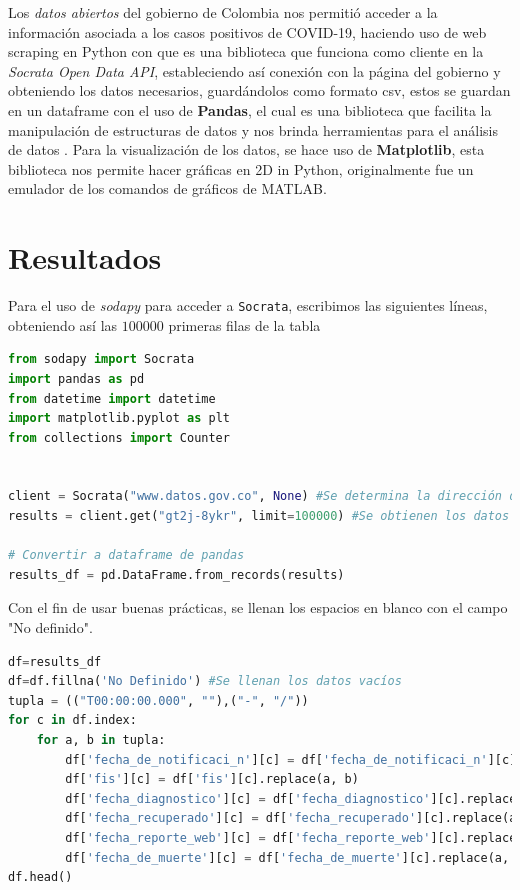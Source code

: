 \documentclass[conference,compsoc,onecolumn]{IEEEtran}
\begin{document}
Los \textit{datos abiertos} del gobierno de Colombia nos permitió acceder a la información asociada a los casos positivos de COVID-19, haciendo uso de web scraping en Python con  que es una biblioteca que funciona como cliente en la \textit{Socrata Open Data API}, estableciendo así conexión con la página del gobierno y obteniendo los datos necesarios, guardándolos como formato csv, estos se guardan en un dataframe con el uso de \textbf{Pandas}, el cual es una biblioteca que facilita la manipulación de estructuras de datos y nos brinda herramientas para el análisis de datos \cite{Pandas}. Para la visualización de los datos, se hace uso de \textbf{Matplotlib}, esta biblioteca nos permite hacer gráficas en 2D in Python, originalmente fue un emulador de los comandos de gráficos de MATLAB.

\section{Resultados}
\label{sec:results}
Para el uso de \textit{sodapy} para acceder a \texttt{Socrata}, escribimos las siguientes líneas, obteniendo así las $100000$ primeras filas de la tabla
\begin{lstlisting}[language=python]
from sodapy import Socrata
import pandas as pd
from datetime import datetime
import matplotlib.pyplot as plt
from collections import Counter


client = Socrata("www.datos.gov.co", None) #Se determina la dirección de la cual se extraerán los datos
results = client.get("gt2j-8ykr", limit=100000) #Se obtienen los datos y se establece un límite

# Convertir a dataframe de pandas
results_df = pd.DataFrame.from_records(results)
\end{lstlisting}

Con el fin de usar buenas prácticas, se llenan los espacios en blanco con el campo "No definido".

\begin{lstlisting}[language=python]
df=results_df
df=df.fillna('No Definido') #Se llenan los datos vacíos
tupla = (("T00:00:00.000", ""),("-", "/"))
for c in df.index:
    for a, b in tupla:
        df['fecha_de_notificaci_n'][c] = df['fecha_de_notificaci_n'][c].replace(a, b)
        df['fis'][c] = df['fis'][c].replace(a, b)
        df['fecha_diagnostico'][c] = df['fecha_diagnostico'][c].replace(a, b)
        df['fecha_recuperado'][c] = df['fecha_recuperado'][c].replace(a, b)
        df['fecha_reporte_web'][c] = df['fecha_reporte_web'][c].replace(a, b)
        df['fecha_de_muerte'][c] = df['fecha_de_muerte'][c].replace(a, b)
df.head()
\end{lstlisting}
\end{document}
